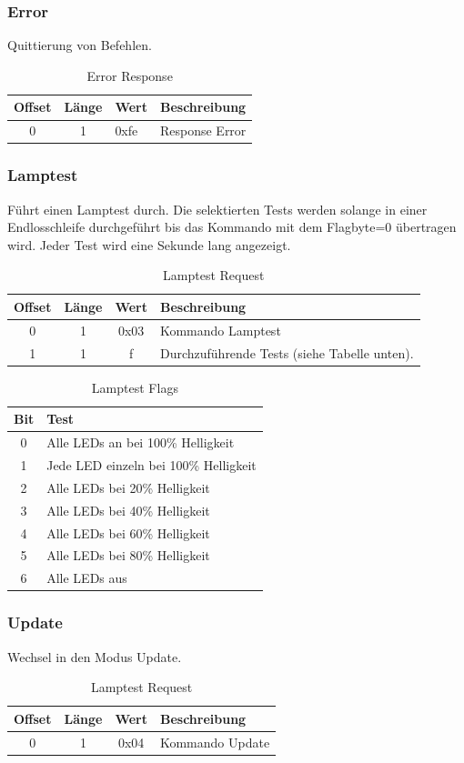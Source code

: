 \documentclass[10pt,a4paper]{article}
\begin{document}
\subsubsection{Error}
\label{sec:Error}
Quittierung von Befehlen.
\begin{table}[H]
\centering
\begin{tabular}{c|c|l|l}
\textbf{Offset} & \textbf{Länge} & \textbf{Wert} & \textbf{Beschreibung} \\ \hline
0 & 1 & 0xfe & Response Error
\end{tabular}
\caption{Error Response}
\end{table}

\subsubsection{Lamptest}
\label{sec:Lamptest}
Führt einen Lamptest durch. Die selektierten Tests werden solange in einer Endlosschleife durchgeführt bis das Kommando mit dem Flagbyte=0 übertragen wird. Jeder Test wird eine Sekunde lang angezeigt.
\begin{table}[H]
\centering
\begin{tabular}{c|c|c|l}
\textbf{Offset} & \textbf{Länge} & \textbf{Wert} & \textbf{Beschreibung} \\ \hline
0 & 1 & 0x03 & Kommando Lamptest\\
1 & 1 & f & Durchzuführende Tests (siehe Tabelle unten). 
\end{tabular}
\caption{Lamptest Request}
\end{table}

\begin{table}[H]
\label{LAMPTEST_FLAGS}
\centering
\begin{tabular}{c|l}
\textbf{Bit} & \textbf{Test} \\ \hline
0 & Alle LEDs an bei 100\% Helligkeit\\
1 & Jede LED einzeln bei 100\% Helligkeit\\
2 & Alle LEDs bei 20\% Helligkeit\\
3 & Alle LEDs bei 40\% Helligkeit\\
4 & Alle LEDs bei 60\% Helligkeit\\
5 & Alle LEDs bei 80\% Helligkeit\\
6 & Alle LEDs aus
\end{tabular}
\caption{Lamptest Flags}
\end{table}

\subsubsection{Update}
\label{sec:Update}
Wechsel in den Modus Update.
\begin{table}[H]
\centering
\begin{tabular}{c|c|c|l}
\textbf{Offset} & \textbf{Länge} & \textbf{Wert} & \textbf{Beschreibung} \\ \hline
0 & 1 & 0x04 & Kommando Update
\end{tabular}
\caption{Lamptest Request}
\end{table}
\end{document}
